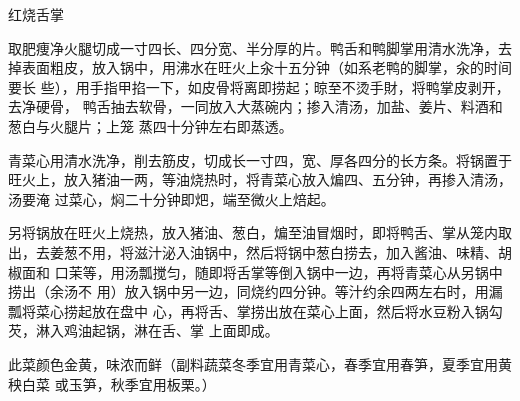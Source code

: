 \begin{recipe}{红烧舌掌}

\ingredients


\preparation

\step 取肥痩净火腿切成一寸四长、四分宽、半分厚的片。鸭舌和鸭脚掌用清水洗净，去
掉表面粗皮，放入锅中，用沸水在旺火上汆十五分钟（如系老鸭的脚掌，汆的时间要长
些），用手指甲掐一下，如皮骨将离即捞起；晾至不烫手財，将鸭掌皮剥开，去净硬骨，
鸭舌抽去软骨，一同放入大蒸碗内；掺入清汤，加盐、姜片、料酒和葱白与火腿片；上笼
蒸四十分钟左右即蒸透。

\step 青菜心用清水洗净，削去筋皮，切成长一寸四，宽、厚各四分的长方条。将锅置于
旺火上，放入猪油一两，等油烧热时，将青菜心放入煸四、五分钟，再掺入清汤，汤要淹
过菜心，焖二十分钟即𤆵，端至微火上焙起。

\step 另将锅放在旺火上烧热，放入猪油、葱白，煸至油冒烟时，即将鸭舌、掌从笼内取
出，去姜葱不用，将滋汁泌入油锅中，然后将锅中葱白捞去，加入酱油、味精、胡椒面和
口茉等，用汤瓢搅匀，随即将舌掌等倒入锅中一边，再将青菜心从另锅中捞出（余汤不
用）放入锅中另一边，同烧约四分钟。等汁约余四两左右时，用漏瓢将菜心捞起放在盘中
心，再将舌、掌捞出放在菜心上面，然后将水豆粉入锅勾芡，淋入鸡油起锅，淋在舌、掌
上面即成。

\features

此菜颜色金黄，味浓而鲜（副料蔬菜冬季宜用青菜心，春季宜用春笋，夏季宜用黄秧白菜
或玉笋，秋季宜用板栗。）

\end{recipe}


